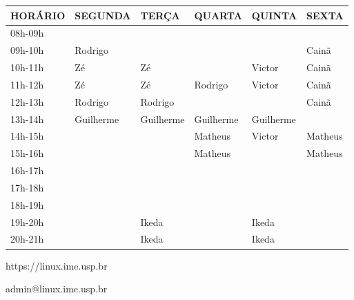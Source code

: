 \documentclass[12pt]{article}
\newcommand{\cai}{Cainã}
\newcommand{\gui}{Guilherme}
\newcommand{\ike}{Ikeda}
\newcommand{\mat}{Matheus}
\newcommand{\rod}{Rodrigo}
\newcommand{\vic}{Victor}
\newcommand{\zee}{Zé}
\newcommand{\tnhl}{\tabularnewline\hline}
\begin{document}
\begin{center}
  \Large
  \begin{tabular}{ |x{3.5cm}|x{3.5cm}|x{3.5cm}|x{3.5cm}|x{3.5cm}|x{3.5cm}| }
    \hline
    \textbf{HORÁRIO} & \textbf{SEGUNDA} & \textbf{TERÇA} & \textbf{QUARTA} & \textbf{QUINTA} & \textbf{SEXTA} \tnhl
    08h-09h          & {}               & {}             & {}              & {}              & {}             \tnhl
    09h-10h          & \rod             & {}             & {}              & {}              & \cai           \tnhl
    10h-11h          & \zee             & \zee           & {}              & \vic            & \cai           \tnhl
    11h-12h          & \zee             & \zee           & \rod            & \vic            & \cai           \tnhl
    12h-13h          & \rod             & \rod           & {}              & {}              & \cai           \tnhl
    13h-14h          & \gui             & \gui           & \gui            & \gui            & {}             \tnhl
    14h-15h          & {}               & {}             & \mat            & \vic            & \mat           \tnhl
    15h-16h          & {}               & {}             & \mat            & {}              & \mat           \tnhl
    16h-17h          & {}               & {}             & {}              & {}              & {}             \tnhl
    17h-18h          & {}               & {}             & {}              & {}              & {}             \tnhl
    18h-19h          & {}               & {}             & {}              & {}              & {}             \tnhl
    19h-20h          & {}               & \ike           & {}              & \ike            & {}             \tnhl
    20h-21h          & {}               & \ike           & {}              & \ike            & {}             \tnhl
  \end{tabular}

  \vspace{1.5cm}
  {\selectfont
    \normalsize
    https://linux.ime.usp.br
    
    admin@linux.ime.usp.br
  }
\end{center}
\end{document}
